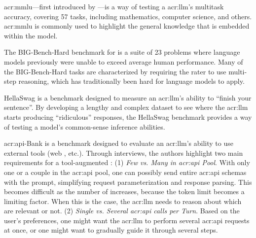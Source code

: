 \gls{acr:mmlu}---first introduced by \cite{hendrycksMeasuringMassiveMultitask2021}---is a way of testing a \acrlong{acr:llm}'s multitask accuracy, covering 57 tasks, including mathematics, computer science, and others. \gls{acr:mmlu} is commonly used to highlight the general knowledge that is embedded within the model.

The BIG-Bench-Hard benchmark \citep{suzgunChallengingBIGBenchTasks2022} for  is a suite of 23 problems where language models previously were unable to exceed average human performance. Many of the BIG-Bench-Hard tasks are characterized by requiring the rater to use multi-step reasoning, which has traditionally been hard for language models to apply.

HellaSwag \citep{zellersHellaSwagCanMachine2019} is a benchmark designed to measure an \acrshort{acr:llm}'s ability to \enquote{finish your sentence}. By developing a lengthy and complex dataset to see where the \acrshort{acr:llm} starts producing \enquote{ridiculous} responses, the HellaSwag benchmark provides a way of testing a model's common-sense inference abilities.

\acrshort{acr:api}-Bank \citep{liAPIBankComprehensiveBenchmark2023} is a benchmark designed to evaluate an \acrshort{acr:llm}'s ability to use external tools (web , etc.). Through interviews, the authors highlight two main requirements for a tool-augmented  \citep[2]{liAPIBankComprehensiveBenchmark2023}: (1) \textit{Few vs. Many  in \acrshort{acr:api} Pool}. With only one or a couple  in the \acrshort{acr:api} pool, one can possibly send entire \acrshort{acr:api} schemas with the prompt, simplifying request parameterization and response parsing. This becomes difficult as the number of  increases, because the token limit becomes a limiting factor. When this is the case, the \acrshort{acr:llm} needs to reason about which  are relevant or not. (2) \textit{Single vs. Several \acrshort{acr:api} calls per Turn}. Based on the user's preferences, one might want the \acrshort{acr:llm} to perform several \acrshort{acr:api} requests at once, or one might want to gradually guide it through several steps.

\glsresetall